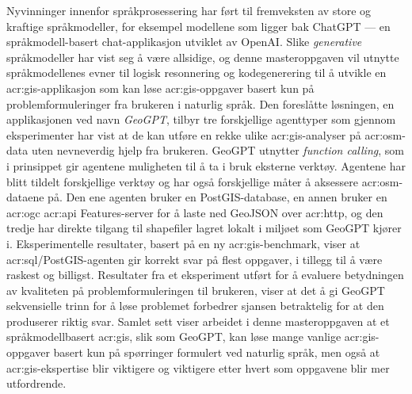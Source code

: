 Nyvinninger innenfor språkprosessering har ført til fremveksten av store og kraftige språkmodeller, for eksempel modellene som ligger bak ChatGPT --- en språkmodell-basert chat-applikasjon utviklet av OpenAI. Slike \textit{generative} språkmodeller har vist seg å være allsidige, og denne masteroppgaven vil utnytte språkmodellenes evner til logisk resonnering og kodegenerering til å utvikle en \acrshort{acr:gis}-applikasjon som kan løse \acrshort{acr:gis}-oppgaver basert kun på problemformuleringer fra brukeren i naturlig språk. Den foreslåtte løsningen, en applikasjonen ved navn \textit{GeoGPT}, tilbyr tre forskjellige agenttyper som gjennom eksperimenter har vist at de kan utføre en rekke ulike \acrshort{acr:gis}-analyser på \gls{acr:osm}-data uten nevneverdig hjelp fra brukeren. GeoGPT utnytter \textit{function calling}, som i prinsippet gir agentene muligheten til å ta i bruk eksterne verktøy. Agentene har blitt tildelt forskjellige verktøy og har også forskjellige måter å aksessere \gls{acr:osm}-dataene på. Den ene agenten bruker en PostGIS-database, en annen bruker en \acrshort{acr:ogc} \acrshort{acr:api} Features-server for å laste ned GeoJSON over \acrshort{acr:http}, og den tredje har direkte tilgang til shapefiler lagret lokalt i miljøet som GeoGPT kjører i. Eksperimentelle resultater, basert på en ny \acrshort{acr:gis}-benchmark, viser at \acrshort{acr:sql}/PostGIS-agenten gir korrekt svar på flest oppgaver, i tillegg til å være raskest og billigst. Resultater fra et eksperiment utført for å evaluere betydningen av kvaliteten på problemformuleringen til brukeren, viser at det å gi GeoGPT sekvensielle trinn for å løse problemet forbedrer sjansen betraktelig for at den produserer riktig svar. Samlet sett viser arbeidet i denne masteroppgaven at et språkmodellbasert \acrshort{acr:gis}, slik som GeoGPT, kan løse mange vanlige \acrshort{acr:gis}-oppgaver basert kun på spørringer formulert ved naturlig språk, men også at \acrshort{acr:gis}-ekspertise blir viktigere og viktigere etter hvert som oppgavene blir mer utfordrende.


